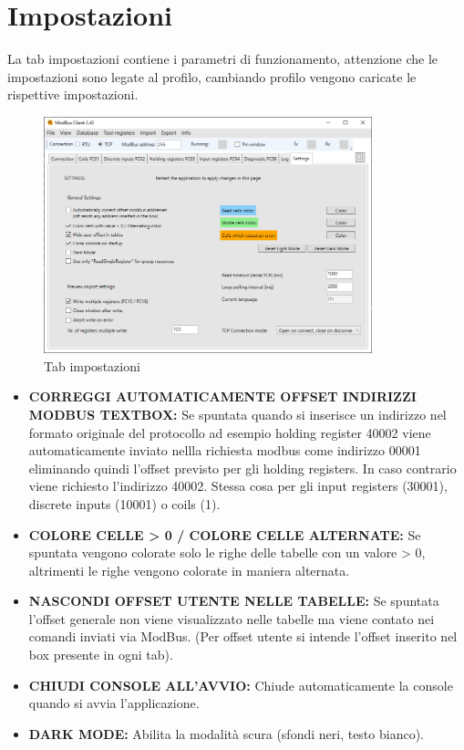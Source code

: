 
\chapter{Impostazioni}

La tab impostazioni contiene i parametri di funzionamento,
attenzione che le impostazioni sono legate al profilo,
cambiando profilo vengono caricate le rispettive impostazioni.

\begin{figure}[H]
    \centering
    \includegraphics[width=0.85\textwidth]{../Img/Modbus_Client_Settings_00.PNG}
    \caption{Tab impostazioni}
\end{figure}

\begin{itemize}
    \item \textbf{CORREGGI AUTOMATICAMENTE OFFSET INDIRIZZI MODBUS TEXTBOX:}
    Se spuntata quando si inserisce un indirizzo nel formato originale del protocollo ad esempio
    holding register 40002 viene automaticamente inviato nellla richiesta modbus come indirizzo
    00001 eliminando quindi l'offset previsto per gli holding registers. In caso contrario viene 
    richiesto
    l'indirizzo 40002. Stessa cosa per gli input registers (30001), discrete inputs (10001)
    o coils (1).
    \item \textbf{COLORE CELLE > 0 / COLORE CELLE ALTERNATE:}
    Se spuntata vengono colorate solo le righe delle tabelle con un valore > 0, altrimenti le righe
    vengono colorate in maniera alternata.
    \item \textbf{NASCONDI OFFSET UTENTE NELLE TABELLE:}
    Se spuntata l'offset generale non viene visualizzato nelle tabelle ma viene contato nei comandi
    inviati via ModBus. (Per offset utente si intende l'offset inserito nel box presente
    in ogni tab).
    \item \textbf{CHIUDI CONSOLE ALL'AVVIO:}
    Chiude automaticamente la console quando si avvia l'applicazione.
    \item \textbf{DARK MODE:}
    Abilita la modalità scura (sfondi neri, testo bianco).
\end{itemize}

